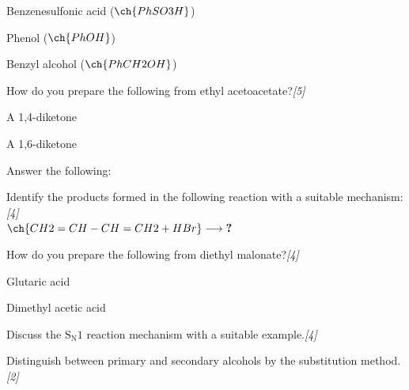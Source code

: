 \documentclass[11pt,a4paper]{article}
\newcommand{\pts}[1]{\hfill   \textit{[#1]}}
\begin{document}
\begin{enumerate}[label=   \textbf{\arabic*.}]
\begin{parts}
\begin{parts}
            \item Benzenesulfonic acid ($\ch{PhSO3H}$)
            \item Phenol ($\ch{PhOH}$)
            \item Benzyl alcohol ($\ch{PhCH2OH}$)
        \end{parts}
        \item How do you prepare the following from ethyl acetoacetate?\pts{5}
        
\begin{parts}
            \item A 1,4-diketone
            \item A 1,6-diketone
        \end{parts}
    \end{parts}

    \bigskip

    \item Answer the following:
    
\begin{parts}
        \item Identify the products formed in the following reaction with a suitable mechanism:\pts{4}\\[4pt]
        $\ch{CH2=CH-CH=CH2 + HBr} \longrightarrow   \textbf{?}$
        \item How do you prepare the following from diethyl malonate?\pts{4}
        
\begin{parts}
            \item Glutaric acid
            \item Dimethyl acetic acid
        \end{parts}
        \item Discuss the $ \text{S}_ \text{N}1$ reaction mechanism with a suitable example.\pts{4}
        \item Distinguish between primary and secondary alcohols by the substitution method.\pts{2}
    \end{parts}

\end{enumerate}
\end{document}
